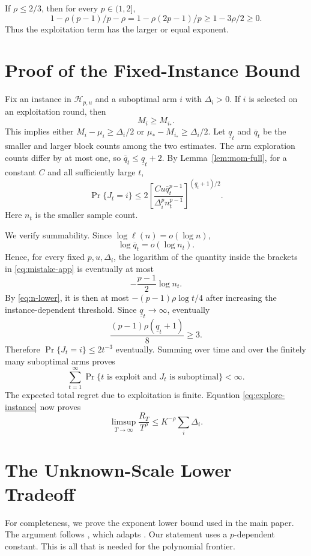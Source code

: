 \documentclass[twoside]{article}
\newcommand{\cH}{\mathcal H}
\begin{document}
If $\rho\leq2/3$, then for every $p\in(1,2]$,
\[
 1-\rho(p-1)/p-\rho
 =1-\rho(2p-1)/p
 \geq1-3\rho/2\geq0.
\]
Thus the exploitation term has the larger or equal exponent.

\section{Proof of the Fixed-Instance Bound}
\label{app:instance}

Fix an instance in $\cH_{p,u}$ and a suboptimal arm $i$ with
$\Delta_i>0$. If $i$ is selected on an exploitation round, then
\[
 M_i\geq M_{i_*}.
\]
This implies either $M_i-\mu_i\geq\Delta_i/2$ or
$\mu_*-M_{i_*}\geq\Delta_i/2$. Let $\underline q_t$ and
$\overline q_t$ be the smaller and larger block counts among the two
estimates. The arm exploration counts differ by at most one, so
$\overline q_t\leq\underline q_t+2$. By Lemma~\ref{lem:mom-full}, for a
constant $C$ and all sufficiently large $t$,
\begin{equation}
 \Pr\{J_t=i\}
 \leq2\left[
 \frac{Cu \overline q_t^{p-1}}
 {\Delta_i^p n_t^{p-1}}
 \right]^{(\underline q_t+1)/2}.
 \label{eq:mistake-app}
\end{equation}
Here $n_t$ is the smaller sample count.

We verify summability. Since $\log\ell(n)=o(\log n)$,
\[
 \log \overline q_t=o(\log n_t).
\]
Hence, for every fixed $p,u,\Delta_i$, the logarithm of the quantity inside
the brackets in \eqref{eq:mistake-app} is eventually at most
\[
 -\frac{p-1}{2}\log n_t.
\]
By \eqref{eq:n-lower}, it is then at most
$-(p-1)\rho\log t/4$ after increasing the instance-dependent threshold.
Since $\underline q_t\to\infty$, eventually
\[
 \frac{(p-1)\rho(\underline q_t+1)}8\geq3.
\]
Therefore $\Pr\{J_t=i\}\leq2t^{-3}$ eventually. Summing over time and over
the finitely many suboptimal arms proves
\[
 \sum_{t=1}^\infty
 \Pr\{t\text{ is exploit and }J_t\text{ is suboptimal}\}<\infty.
\]
The expected total regret due to exploitation is finite. Equation
\eqref{eq:explore-instance} now proves
\[
 \limsup_{T\to\infty}\frac{R_T}{T^\rho}
 \leq K^{-\rho}\sum_i\Delta_i.
\]

\section{The Unknown-Scale Lower Tradeoff}
\label{app:lower}

For completeness, we prove the exponent lower bound used in the main paper.
The argument follows \citet{genalti2025lower}, which adapts
\citet{hadiji2023range}. Our statement uses a $p$-dependent constant. This is
all that is needed for the polynomial frontier.
\end{document}

